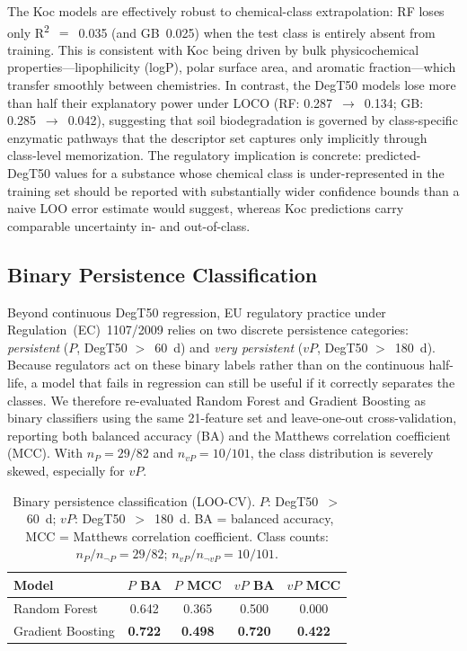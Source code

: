 \documentclass[12pt,a4paper]{article}
\newcommand{\degtl}{DegT50}
\newcommand{\rtwo}{R\textsuperscript{2}}
\newcommand{\nfeat}{21}
\begin{document}
The Koc models are effectively robust to chemical-class extrapolation:
RF loses only \rtwo{}~$=$~0.035 (and GB~0.025) when the test class is
entirely absent from training. This is consistent with Koc being driven
by bulk physicochemical properties---lipophilicity (logP), polar surface
area, and aromatic fraction---which transfer smoothly between chemistries.
In contrast, the \degtl{} models lose more than half their explanatory
power under LOCO (RF: 0.287~$\to$~0.134; GB: 0.285~$\to$~0.042), suggesting
that soil biodegradation is governed by class-specific enzymatic pathways
that the descriptor set captures only implicitly through class-level
memorization. The regulatory implication is concrete: predicted-\degtl{}
values for a substance whose chemical class is under-represented in the
training set should be reported with substantially wider confidence
bounds than a naive LOO error estimate would suggest, whereas Koc
predictions carry comparable uncertainty in- and out-of-class.


\subsection{Binary Persistence Classification}
\label{sec:results_binary}

Beyond continuous \degtl{} regression, EU regulatory practice under
Regulation~(EC)~1107/2009 relies on two discrete persistence categories:
\emph{persistent} ($P$, \degtl{} $>$~60~d) and \emph{very persistent}
($vP$, \degtl{} $>$~180~d). Because regulators act on these binary
labels rather than on the continuous half-life, a model that fails in
regression can still be useful if it correctly separates the classes.
We therefore re-evaluated Random Forest and Gradient Boosting as binary
classifiers using the same \nfeat{}-feature set and leave-one-out
cross-validation, reporting both balanced accuracy (BA) and the Matthews
correlation coefficient (MCC). With $n_P = 29 / 82$ and $n_{vP} = 10 /
101$, the class distribution is severely skewed, especially for $vP$.

\begin{table}[htbp]
  \centering
  \caption{Binary persistence classification (LOO-CV). $P$: \degtl~$>$~60~d;
           $vP$: \degtl~$>$~180~d. BA = balanced accuracy, MCC = Matthews
           correlation coefficient. Class counts: $n_P/n_{\neg P} = 29/82$;
           $n_{vP}/n_{\neg vP} = 10/101$.}
  \label{tab:binary}
  \small
  \begin{tabular}{lcccc}
    \toprule
    \textbf{Model} & \textbf{$P$ BA} & \textbf{$P$ MCC} &
      \textbf{$vP$ BA} & \textbf{$vP$ MCC} \\
    \midrule
    Random Forest     & 0.642 & 0.365 & 0.500 & 0.000 \\
    Gradient Boosting & \textbf{0.722} & \textbf{0.498} &
                        \textbf{0.720} & \textbf{0.422} \\
    \bottomrule
  \end{tabular}
\end{table}
\end{document}
